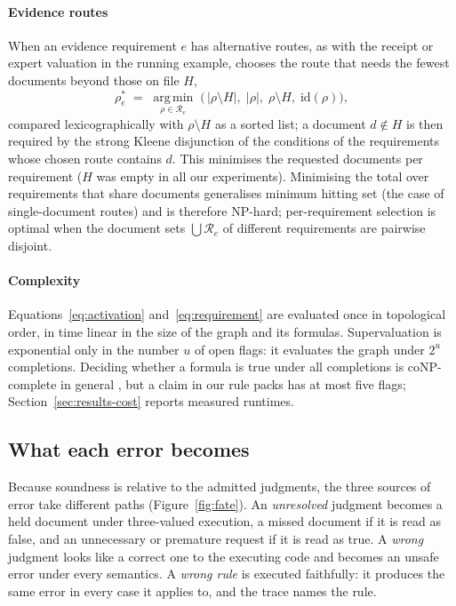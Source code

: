\paragraph{Evidence routes}
When an evidence requirement $e$ has alternative routes, as with the receipt or expert valuation in the running example, \casepath chooses the route that needs the fewest documents beyond those on file $H$,
\begin{equation}
\rho^\ast_e \;=\; \operatorname*{arg\,min}_{\rho\in\mathcal{R}_e}\;\bigl(\,|\rho\setminus H|,\;|\rho|,\;\rho\setminus H,\;\mathrm{id}(\rho)\bigr),
\label{eq:route}
\end{equation}
compared lexicographically with $\rho\setminus H$ as a sorted list; a document $d\notin H$ is then required by the strong Kleene disjunction of the conditions of the requirements whose chosen route contains $d$. This minimises the requested documents per requirement ($H$ was empty in all our experiments). Minimising the total over requirements that share documents generalises minimum hitting set (the case of single-document routes) and is therefore NP-hard; per-requirement selection is optimal when the document sets $\bigcup\mathcal{R}_e$ of different requirements are pairwise disjoint.

\paragraph{Complexity}
Equations~\eqref{eq:activation} and~\eqref{eq:requirement} are evaluated once in topological order, in time linear in the size of the graph and its formulas. Supervaluation is exponential only in the number $u$ of open flags: it evaluates the graph under $2^u$ completions. Deciding whether a formula is true under all completions is coNP-complete in general \cite{cook1971complexity}, but a claim in our rule packs has at most five flags; Section~\ref{sec:results-cost} reports measured runtimes.

\subsection{What each error becomes}
\label{sec:fate}

Because soundness is relative to the admitted judgments, the three sources of error take different paths (Figure~\ref{fig:fate}). An \emph{unresolved} judgment becomes a held document under three-valued execution, a missed document if it is read as false, and an unnecessary or premature request if it is read as true. A \emph{wrong} judgment looks like a correct one to the executing code and becomes an unsafe error under every semantics. A \emph{wrong rule} is executed faithfully: it produces the same error in every case it applies to, and the trace names the rule.

